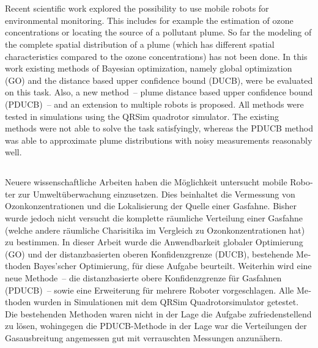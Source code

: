 \documentclass[11pt,a4paper,twoside,BCOR=15mm,listof=totoc]{scrbook}
\begin{document}
\cleardoublepage\thispagestyle{empty}
\vspace*{\fill}
\section*{\abstractname}
Recent scientific work explored the possibility to use mobile robots for 
environmental monitoring. This includes for example the estimation of ozone 
concentrations or locating the source of a pollutant plume. So far the modeling 
of the complete spatial distribution of a plume (which has different spatial 
characteristics compared to the ozone concentrations) has not been done.  In 
this work existing methods of Bayesian optimization, namely global optimization 
(GO) and the distance based upper confidence bound (DUCB), were be evaluated on 
this task.  Also, a new method~-- plume distance based upper confidence bound 
(PDUCB)~-- and an extension to multiple robots is proposed.  All methods were 
tested in simulations using the QRSim quadrotor simulator. The existing methods 
were not able to solve the task satisfyingly, whereas the PDUCB method was able 
to approximate plume distributions with noisy measurements reasonably well.

\begin{german}
\section*{\abstractname}
Neuere wissenschaftliche Arbeiten haben die Möglichkeit untersucht mobile 
Roboter zur Umweltüberwachung einzusetzen. Dies beinhaltet die Vermessung von 
Ozonkonzentrationen und die Lokalisierung der Quelle einer Gasfahne. Bisher 
wurde jedoch nicht versucht die komplette räumliche Verteilung einer Gasfahne 
(welche andere räumliche Charisitika im Vergleich zu Ozonkonzentrationen hat) zu 
bestimmen.  In dieser Arbeit wurde die Anwendbarkeit globaler Optimierung (GO) 
und der distanzbasierten oberen Konfidenzgrenze (DUCB), bestehende Methoden 
Bayes'scher Optimierung, für diese Aufgabe beurteilt.  Weiterhin wird eine neue 
Methode~-- die distanzbasierte obere Konfidenzgrenze für Gasfahnen (PDUCB)~-- 
sowie eine Erweiterung für mehrere Roboter vorgeschlagen. Alle Methoden wurden 
in Simulationen mit dem QRSim Quadrotorsimulator getestet. Die bestehenden 
Methoden waren nicht in der Lage die Aufgabe zufriedenstellend zu lösen, 
wohingegen die PDUCB-Methode in der Lage war die Verteilungen der Gasausbreitung 
angemessen gut mit verrauschten Messungen anzunähern.
\end{german}
\vspace*{\fill}
\end{document}
